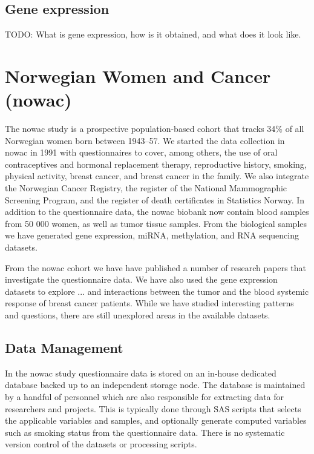 \subsection{Gene expression} 
TODO: What is gene expression, how is it obtained, and what does it look like.

\section{Norwegian Women and Cancer (\gls{nowac})} 
The \gls{nowac} study is a prospective population-based cohort that tracks 34\%
of all Norwegian women born between 1943–57.\cite{lund2007cohort} We started the
data collection in \gls{nowac} in 1991 with questionnaires to cover, among
others, the use of oral contraceptives and hormonal replacement therapy,
reproductive history, smoking, physical activity, breast cancer, and breast
cancer in the family.  We also integrate the Norwegian Cancer Registry, the
register of the National Mammographic Screening Program, and the register of
death certificates in Statistics Norway.  In addition to the questionnaire data,
the \gls{nowac} biobank now contain blood samples from 50 000 women, as well as
tumor tissue samples. From the biological samples we have generated gene
expression, miRNA, methylation, and RNA sequencing datasets. 

From the \gls{nowac} cohort we have have published a number of research papers
that investigate the questionnaire data\cite{find-some-papers}. We have also
used the gene expression datasets to explore ... and interactions between the
tumor and the blood systemic response of breast cancer
patients.\cite{dumeaux2017interactions} While we have studied interesting
patterns and questions, there are still unexplored areas in the available
datasets.

\subsection{Data Management} 
In the \gls{nowac} study questionnaire data is stored on an in-house dedicated
database backed up to an independent storage node. The database is maintained by
a handful of personnel which are also responsible for extracting data for
researchers and projects. This is typically done through SAS scripts that
selects the applicable variables and samples, and optionally generate computed
variables such as smoking status from the questionnaire data. There is no
systematic version control of the datasets or processing scripts. 

